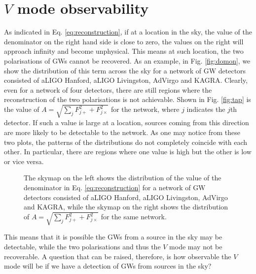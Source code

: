 \documentclass[aps,twocolumn,showpacs,groupedaddress, nofootinbib]{revtex4}  %
\begin{document}
\section{$V$ mode observability}\label{sec:vobsered}
As indicated in Eq. \ref{eq:reconstruction}, if at a location in the sky, the value of the denominator 
on the right hand side is close to zero, the values on the right will approach infinity 
and become unphysical. This means at such location, the two polarisations of \acp{GW} cannot be recovered. 
As an example, in Fig. \ref{fig:domon}, we show the distribution of this term across 
the sky for a network of \ac{GW} detectors consisted of \ac{aLIGO} Hanford, \ac{aLIGO} Livingston,
\ac{AdVirgo} and KAGRA. 
Clearly, even for a network of four detectors, there are still regions where the reconstruction of the two polarisations is not achievable.
Shown in Fig. \ref{fig:tap} is the value of $A = \sqrt{\sum_{j} F_{j+}^2 +  F_{j\times}^2}$ for the network, where $j$ indicates the $j$th detector.
If such a value is large at a location, sources coming from this direction are more likely to be detectable to the network.
As one may notice from these two plots, the patterns of the distributions do not completely coincide with each other.
In particular, there are regions where one value is high but the other is low or vice versa.
\begin{figure}
     \begin{center}
        \quad
    \end{center}
    \caption{The skymap on the left shows the distribution of the value of the denominator in Eq. \ref{eq:reconstruction} for a network of \ac{GW} detectors consisted of \ac{aLIGO} Hanford, \ac{aLIGO} Livingston,
\ac{AdVirgo} and KAGRA, while the skymap on the right shows the distribution of $A = \sqrt{\sum_{j} F_{j+}^2 +  F_{j\times}^2}$ for the same network. 
    \label{fig:domonapcom}} 
\end{figure}
This means that it is possible the \acp{GW} from a source in the sky may be detectable, while the two polarisations and thus the $V$ mode may not be recoverable.
A question that can be raised, therefore, is how observable the $V$ mode will be if we have a detection of \acp{GW} from sources in the sky? 
\end{document}
